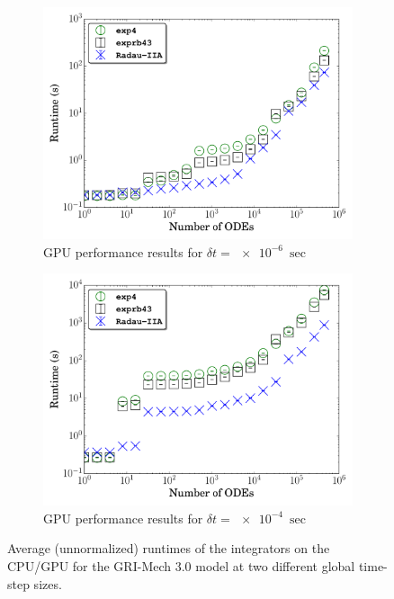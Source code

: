 \documentclass[final,twocolumn]{elsarticle}
\begin{document}
\begin{figure}[htb]
\begin{subfigure}{0.49\textwidth}
      \includegraphics[width=\linewidth]{CH4_1e-06_gpu_nonorm.pdf}
      \caption{GPU performance results for $\delta t = \SI{e-6}{\sec}$}
  \end{subfigure}
  \begin{subfigure}{0.49\textwidth}
      \includegraphics[width=\linewidth]{CH4_1e-04_gpu_nonorm.pdf}
      \caption{GPU performance results for $\delta t = \SI{e-4}{\sec}$}
  \end{subfigure}
  \caption{Average (unnormalized) runtimes of the integrators on the CPU\slash GPU for the GRI-Mech 3.0 model at two different global time-step sizes.}
\end{figure}

\clearpage

\ifmeasure
\footnotesize
\baselineskip 9pt
\setlength{\bibsep}{0pt plus 0.3ex}
\fi


\fi
\end{document}
